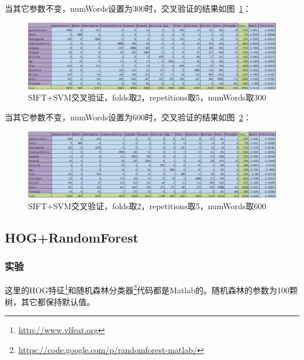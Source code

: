 \documentclass[12pt]{article}
\begin{document}
\begin{enumerate}
\begin{itemize}
当其它参数不变，numWords设置为300时，交叉验证的结果如图~\ref{fig: SIFT-SVM-2-folds-5-repetitions-300}：

\begin{figure}[!ht]
\centering
\includegraphics[width=1.0\linewidth]{SIFT-SVM-2-folds-5-repetitions-300}
\caption{SIFT+SVM交叉验证，folds取2，repetitions取5，numWords取300}
\label{fig: SIFT-SVM-2-folds-5-repetitions-300}
\end{figure}

当其它参数不变，numWords设置为600时，交叉验证的结果如图~\ref{fig: SIFT-SVM-2-folds-5-repetitions-600}：

\begin{figure}[!ht]
\centering
\includegraphics[width=1.0\linewidth]{SIFT-SVM-2-folds-5-repetitions-600}
\caption{SIFT+SVM交叉验证，folds取2，repetitions取5，numWords取600}
\label{fig: SIFT-SVM-2-folds-5-repetitions-600}
\end{figure}

\end{itemize}

\end{enumerate}

\subsection{HOG+RandomForest}

\subsubsection{实验}

这里的HOG特征\footnote{\url{http://www.vlfeat.org}}和随机森林分类器\footnote{\url{https://code.google.com/p/randomforest-matlab/}}代码都是Matlab的。随机森林的参数为100颗树，其它都保持默认值。
\end{document}
